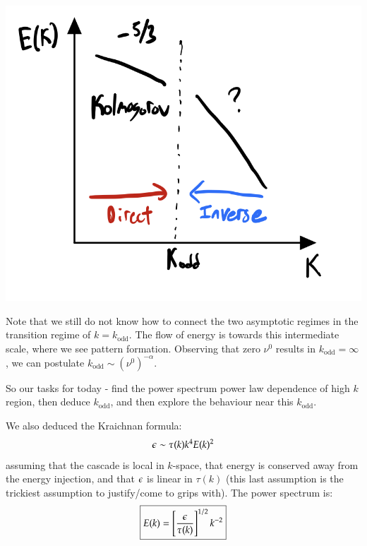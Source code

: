 \begin{center}
    \includegraphics[scale=0.4]{Lectures/Images/lec15-oddpowerspectrum.png}
\end{center}

Note that we still do not know how to connect the two asymptotic regimes in the transition regime of $k = k_{\text{odd}}$. The flow of energy is towards this intermediate scale, where we see pattern formation. Observing that zero $\nu^0$ results in $k_{\text{odd}} = \infty$, we can postulate $k_{\text{odd}} \sim (\nu^0)^{-\alpha}$. 

So our tasks for today - find the power spectrum power law dependence of high $k$ region, then deduce $k_{\text{odd}}$, and then explore the behaviour near this $k_{\text{odd}}$.

We also deduced the Kraichnan formula:
\begin{equation}
    \epsilon \sim \tau(k) k^4E(k)^2
\end{equation}
assuming that the cascade is local in $k$-space, that energy is conserved away from the energy injection, and that $\epsilon$ is linear in $\tau(k)$ (this last assumption is the trickiest assumption to justify/come to grips with). The power spectrum is:
\begin{equation}
    \boxed{E(k) = \left[\frac{\epsilon}{\tau(k)}\right]^{1/2}k^{-2}}
\end{equation}

